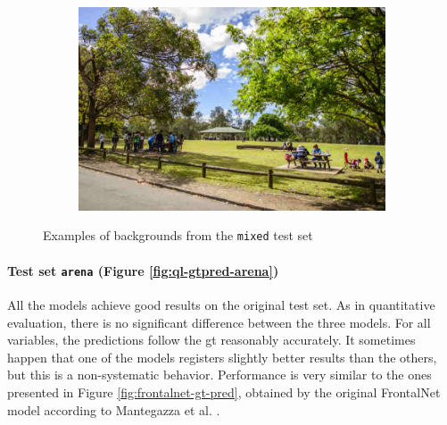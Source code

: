 \begin{figure}[!h]
\begin{center}
\begin{subfigure}[h]{0.24\textwidth}
		\end{subfigure}
		\hfill
		\begin{subfigure}[h]{0.24\textwidth}
			\centering
			\includegraphics[width=1\textwidth]{"contents/images/06-img-park"}
		\end{subfigure}
	\end{center}
	\vspace{-0.5cm}
	\caption[Examples of backgrounds from the \texttt{mixed} test set]{Examples of backgrounds from the \texttt{mixed} test set}
	\label{fig:ql-mixedset}
\end{figure}

\paragraph*{Test set \texttt{arena} (Figure \ref{fig:ql-gtpred-arena})}

All the models achieve good results on the original test set. As in quantitative evaluation, there is no significant difference between the three models. For all variables, the predictions follow the \gls{gt} reasonably accurately. It sometimes happen that one of the models registers slightly better results than the others, but this is a non-systematic behavior. Performance is very similar to the ones presented in Figure \ref{fig:frontalnet-gt-pred}, obtained by the original FrontalNet model according to Mantegazza et al. \cite{mantegazza2019visionbased}.

